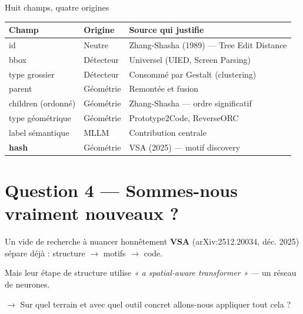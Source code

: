 \documentclass[11pt]{beamer}
\begin{document}
\begin{frame}{Huit champs, quatre origines}
  \small
  \begin{table}
    \centering
    \begin{tabular}{lll}
      \toprule
      Champ & Origine & Source qui justifie \\
      \midrule
      id & Neutre & Zhang-Shasha (1989) --- Tree Edit Distance \\
      bbox & Détecteur & Universel (UIED, Screen Parsing) \\
      type grossier & Détecteur & Consommé par Gestalt (clustering) \\
      parent & Géométrie & Remontée et fusion \\
      children (ordonné) & Géométrie & Zhang-Shasha --- ordre significatif \\
      type géométrique & Géométrie & Prototype2Code, ReverseORC \\
      label sémantique & MLLM & Contribution centrale \\
      \textbf{hash} & Géométrie & VSA (2025) --- motif discovery \\
      \bottomrule
    \end{tabular}
  \end{table}
\end{frame}

\section{Question 4 --- Sommes-nous vraiment nouveaux ?}

\begin{frame}{Un vide de recherche à nuancer honnêtement}
  \textbf{VSA} (arXiv:2512.20034, déc. 2025) sépare déjà : structure $\rightarrow$
  motifs $\rightarrow$ code.

  \vspace{1em}
  \alert{Mais leur étape de structure utilise \textit{« a spatial-aware
  transformer »} --- un réseau de neurones.}

  \vspace{1em}
  
  \vspace{1em}
  \alert{$\rightarrow$ Sur quel terrain  et avec quel outil concret allons-nous
  appliquer tout cela ?}
\end{frame}
\end{document}
